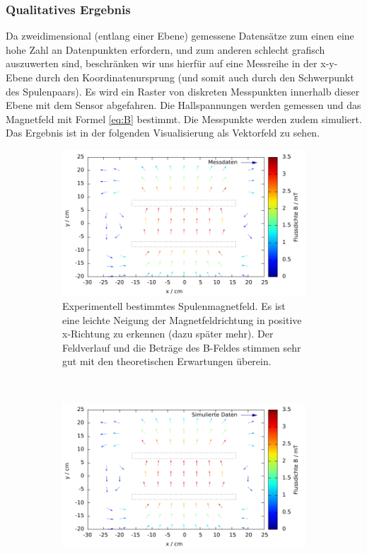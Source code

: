 \documentclass[12pt,a4paper]{article}
\begin{document}
\subsubsection{Qualitatives Ergebnis}
\label{qual}
Da zweidimensional (entlang einer Ebene) gemessene Datensätze zum einen eine hohe Zahl an Datenpunkten erfordern, und zum anderen schlecht grafisch auszuwerten sind, beschränken wir uns hierfür auf eine Messreihe in der x-y-Ebene durch den Koordinatenursprung (und somit auch durch den Schwerpunkt des Spulenpaars). Es wird ein Raster von diskreten Messpunkten innerhalb dieser Ebene mit dem Sensor abgefahren. Die Hallspannungen werden gemessen und das Magnetfeld mit Formel \ref{eq:B} bestimmt. Die Messpunkte werden zudem simuliert. Das Ergebnis ist in der folgenden Visualisierung als Vektorfeld zu sehen.
\begin{figure}[H]
	\centering
	\begin{subfigure}[c]{0.8\textwidth}
		\centering
		\includegraphics[scale=1.1]{exp_ebene.pdf}
		\caption{Experimentell bestimmtes Spulenmagnetfeld. Es ist eine leichte Neigung der Magnetfeldrichtung in positive x-Richtung zu erkennen (dazu später mehr). Der Feldverlauf und die Beträge des B-Feldes stimmen sehr gut mit den theoretischen Erwartungen überein.}
		\label{2da}
	\end{subfigure}
	\\
	\begin{subfigure}[c]{0.8\textwidth}
		\centering
		\includegraphics[scale=1.1]{sim_ebene.pdf}

\end{subfigure}
\end{figure}
\end{document}
